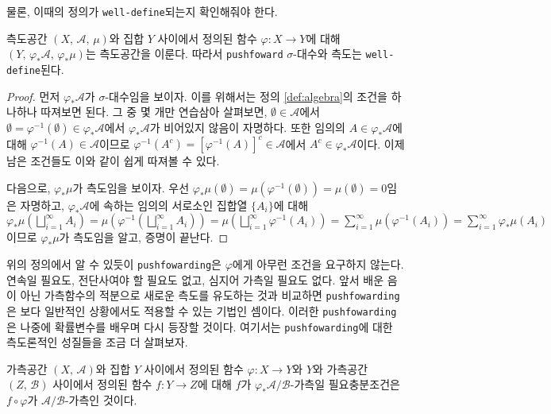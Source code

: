 물론, 이때의 정의가 \texttt{well-define}되는지 확인해줘야 한다.

\begin{proposition}
    측도공간 $(X,\,\mathcal{A},\,\mu)$와 집합 $Y$ 사이에서 정의된 함수 $\varphi:X\to Y$에 대해 $(Y,\,\varphi_*\mathcal{A},\,\varphi_*\mu)$는 측도공간을 이룬다. 따라서 \texttt{pushfoward} $\sigma$-대수와 측도는 \texttt{well-define}된다.
\end{proposition}

\begin{proof}
    먼저 $\varphi_*\mathcal{A}$가 $\sigma$-대수임을 보이자. 이를 위해서는 정의 \ref{def:algebra}의 조건을 하나하나 따져보면 된다. 그 중 몇 개만 연습삼아 살펴보면, $\emptyset\in\mathcal{A}$에서 $\emptyset=\varphi^{-1}(\emptyset)\in\varphi_*\mathcal{A}$에서 $\varphi_*\mathcal{A}$가 비어있지 않음이 자명하다. 또한 임의의 $A\in\varphi_*\mathcal{A}$에 대해 $\varphi^{-1}(A)\in\mathcal{A}$이므로 $\varphi^{-1}(A^c)=[\varphi^{-1}(A)]^c\in\mathcal{A}$에서 $A^c\in\varphi_*\mathcal{A}$이다. 이제 남은 조건들도 이와 같이 쉽게 따져볼 수 있다.

    다음으로, $\varphi_*\mu$가 측도임을 보이자. 우선 $\varphi_*\mu(\emptyset)=\mu(\varphi^{-1}(\emptyset))=\mu(\emptyset)=0$임은 자명하고, $\varphi_*\mathcal{A}$에 속하는 임의의 서로소인 집합열 $\{A_i\}$에 대해 $\varphi_*\mu(\bigsqcup_{i=1}^\infty A_i)=\mu(\varphi^{-1}(\bigsqcup_{i=1}^\infty A_i))=\mu(\bigsqcup_{i=1}^\infty\varphi^{-1}(A_i))=\sum_{i=1}^\infty\mu(\varphi^{-1}(A_i))=\sum_{i=1}^\infty\varphi_*\mu(A_i)$이므로 $\varphi_*\mu$가 측도임을 알고, 증명이 끝난다.
\end{proof}

위의 정의에서 알 수 있듯이 \texttt{pushfowarding}은 $\varphi$에게 아무런 조건을 요구하지 않는다. 연속일 필요도, 전단사여야 할 필요도 없고, 심지어 가측일 필요도 없다. 앞서 배운 음이 아닌 가측함수의 적분으로 새로운 측도를 유도하는 것과 비교하면 \texttt{pushfowarding}은 보다 일반적인 상황에서도 적용할 수 있는 기법인 셈이다. 이러한 \texttt{pushfowarding}은 나중에 확률변수를 배우며 다시 등장할 것이다. 여기서는 \texttt{pushfowarding}에 대한 측도론적인 성질들을 조금 더 살펴보자.

\begin{theorem}
    가측공간 $(X,\,\mathcal{A})$와 집합 $Y$ 사이에서 정의된 함수 $\varphi:X\to Y$와 $Y$와 가측공간 $(Z,\,\mathcal{B})$ 사이에서 정의된 함수 $f:Y\to Z$에 대해 $f$가 $\varphi_*\mathcal{A}/\mathcal{B}$-가측일 필요충분조건은 $f\circ\varphi$가 $\mathcal{A}/\mathcal{B}$-가측인 것이다.
\end{theorem}

